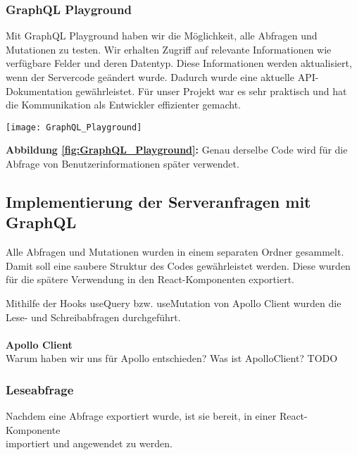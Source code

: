 \subsubsection{GraphQL Playground}
Mit GraphQL Playground haben wir die Möglichkeit, alle Abfragen und Mutationen zu testen. Wir erhalten Zugriff auf relevante Informationen wie verfügbare Felder und deren Datentyp. Diese Informationen werden aktualisiert, wenn der Servercode geändert wurde. Dadurch wurde eine aktuelle API-Dokumentation gewährleistet. Für unser Projekt war es sehr praktisch und hat die Kommunikation als Entwickler effizienter gemacht.
\\
\begin{center}
  \texttt{[image: GraphQL\_Playground]}\label{fig:GraphQL_Playground}
\end{center}
\textbf{Abbildung \autoref{fig:GraphQL_Playground}:}
Genau derselbe Code wird für die Abfrage von Benutzerinformationen später verwendet.
\newpage

\subsection{Implementierung der Serveranfragen mit GraphQL}
Alle Abfragen und Mutationen wurden in einem separaten Ordner gesammelt.
Damit soll eine saubere Struktur des Codes gewährleistet werden.
Diese wurden für die spätere Verwendung in den React-Komponenten exportiert.

Mithilfe der Hooks useQuery bzw. useMutation von Apollo Client wurden die Lese- und Schreibabfragen durchgeführt.
\\\\
\textbf{Apollo Client}\\
Warum haben wir uns für Apollo entschieden? Was ist ApolloClient?
TODO
\newpage

\subsubsection{Leseabfrage}
Nachdem eine Abfrage exportiert wurde, ist sie bereit, in einer React-Komponente \\
importiert und angewendet zu werden.


